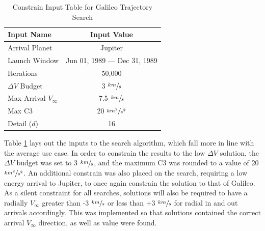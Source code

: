 \documentclass[letterpaper, preprint, paper,11pt]{AAS}	%
\begin{document}
\begin{table}[htb]
    \centering
    \caption{Constrain Input Table for Galileo Trajectory Search}
    \label{table:galiInputs}
    \begin{tabular}{lc}
        \toprule
        \textbf{Input Name} & \textbf{Input Value}\\
        \midrule
        Arrival Planet & Jupiter \\
        Launch Window & Jun 01, 1989 --- Dec 31, 1989 \\
        Iterations & 50,000 \\ 
        $\Delta V$ Budget & 3 $\sfrac{km}{s}$ \\
        Max Arrival $V_{\infty}$ & 7.5 $\sfrac{km}{s}$  \\
        Max C3 & 20 $\sfrac{km^2}{s^2}$ \\
        Detail ($d$) & 16 \\
        \bottomrule
    \end{tabular}
\end{table}

Table \ref*{table:galiInputs} lays out the inputs to the search algorithm, which fall more in line with the average use case. In order to constrain the results to the low $\Delta V$ solution, the $\Delta V$ budget was set to 3 $\sfrac{km}{s}$, and the maximum C3 was rounded to a value of 20 $\sfrac{km^2}{s^2}$. An additional constrain was also placed on the search, requiring a low energy arrival to Jupiter, to once again constrain the solution to that of Galileo. As a silent constraint for all searches, solutions will also be required to have a radially $V_\infty$ greater than -3 $\sfrac{km}{s}$ or less than +3 $\sfrac{km}{s}$ for radial in and out arrivals accordingly. This was implemented so that solutions contained the correct arrival $V_\infty$ direction, as well as value were found.
\end{document}
